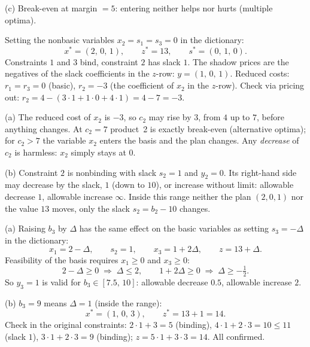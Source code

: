 \begin{solutions}
        (c) Break-even at margin $=5$: entering neither helps nor hurts
        (multiple optima).

  \item Setting the nonbasic variables $x_{2}=s_{1}=s_{3}=0$ in the
        dictionary:
        \[
          x^{*}=(2,\,0,\,1),\qquad z^{*}=13,\qquad
          s^{*}=(0,\,1,\,0).
        \]
        Constraints $1$ and $3$ bind, constraint $2$ has slack $1$. The
        shadow prices are the negatives of the slack coefficients in the
        $z$-row: $y=(1,\,0,\,1)$. Reduced costs: $r_{1}=r_{3}=0$ (basic),
        $r_{2}=-3$ (the coefficient of $x_{2}$ in the $z$-row). Check via
        pricing out: $r_{2}=4-(3\cdot1+1\cdot0+4\cdot1)=4-7=-3$.

  \item (a) The reduced cost of $x_{2}$ is $-3$, so $c_{2}$ may rise by
        $3$, from $4$ up to $7$, before anything changes. At $c_{2}=7$
        product~2 is exactly break-even (alternative optima); for
        $c_{2}>7$ the variable $x_{2}$ enters the basis and the plan
        changes. Any \emph{decrease} of $c_{2}$ is harmless: $x_{2}$
        simply stays at $0$.

        (b) Constraint $2$ is nonbinding with slack $s_{2}=1$ and
        $y_{2}=0$. Its right-hand side may decrease by the slack, $1$
        (down to $10$), or increase without limit:
        allowable decrease $1$, allowable increase $\infty$. Inside this
        range neither the plan $(2,0,1)$ nor the value $13$ moves,
        only the slack $s_{2}=b_{2}-10$ changes.

  \item (a) Raising $b_{3}$ by $\Delta$ has the same effect on the basic
        variables as setting $s_{3}=-\Delta$ in the dictionary:
        \[
          x_{1}=2-\Delta,\qquad s_{2}=1,\qquad x_{3}=1+2\Delta,\qquad
          z=13+\Delta .
        \]
        Feasibility of the basis requires $x_{1}\ge0$ and $x_{3}\ge0$:
        \[
          2-\Delta\ge 0\;\Rightarrow\;\Delta\le 2,\qquad
          1+2\Delta\ge 0\;\Rightarrow\;\Delta\ge -\tfrac12 .
        \]
        So $y_{3}=1$ is valid for $b_{3}\in[7.5,\,10]$: allowable
        decrease $0.5$, allowable increase $2$.

        (b) $b_{3}=9$ means $\Delta=1$ (inside the range):
        \[
          x^{*}=(1,\,0,\,3),\qquad z^{*}=13+1=14 .
        \]
        Check in the original constraints: $2\cdot1+3=5$ (binding),
        $4\cdot1+2\cdot3=10\le 11$ (slack $1$), $3\cdot1+2\cdot3=9$
        (binding); $z=5\cdot1+3\cdot3=14$. All confirmed.


\end{solutions}
